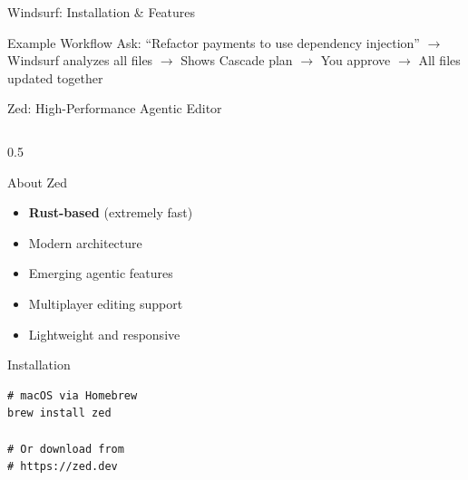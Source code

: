 \documentclass[aspectratio=169,11pt]{beamer}
\begin{document}
\begin{frame}[fragile]{Windsurf: Installation \& Features}
    \vspace{0.2cm}
    \begin{exampleblock}{Example Workflow}
        Ask: ``Refactor payments to use dependency injection'' $\rightarrow$ Windsurf analyzes all files $\rightarrow$ Shows Cascade plan $\rightarrow$ You approve $\rightarrow$ All files updated together
    \end{exampleblock}

\end{frame}

\begin{frame}[fragile]{Zed: High-Performance Agentic Editor}
    \begin{columns}[T]
        \begin{column}{0.5\textwidth}
            \begin{block}{About Zed}
                \begin{itemize}
                    \item \textbf{Rust-based} (extremely fast)
                    \item Modern architecture
                    \item Emerging agentic features
                    \item Multiplayer editing support
                    \item Lightweight and responsive
                \end{itemize}
            \end{block}

            \begin{block}{Installation}
                \begin{lstlisting}[style=bash]
# macOS via Homebrew
brew install zed

# Or download from
# https://zed.dev


\end{lstlisting}
\end{block}
\end{column}
\end{columns}
\end{frame}
\end{document}
